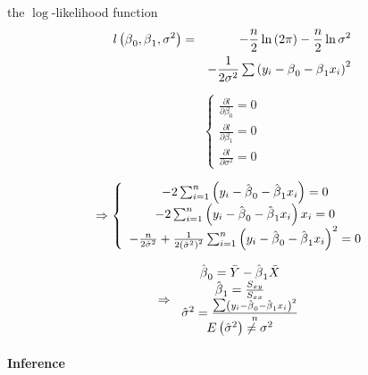 \documentclass{article}
\begin{document}
the $\log $-likelihood function%
\begin{eqnarray*}
l\left( \beta _{0},\beta _{1},\sigma ^{2}\right) &=&-\frac{n}{2}\ln \left(
2\pi \right) -\frac{n}{2}\ln \sigma ^{2} \\
&&-\frac{1}{2\sigma ^{2}}\tsum \left( y_{i}-\beta _{0}-\beta
_{1}x_{i}\right) ^{2}
\end{eqnarray*}

\begin{equation*}
\left\{ 
\begin{array}{c}
\frac{\partial l}{\partial \beta _{0}}=0 \\ 
\frac{\partial l}{\partial \beta _{1}}=0 \\ 
\frac{\partial l}{\partial \sigma ^{2}}=0%
\end{array}%
\right.
\end{equation*}

\begin{equation*}
\Rightarrow \left\{ 
\begin{array}{c}
-2\tsum_{i=1}^{n}\left( y_{i}-\hat{\beta}_{0}-\hat{\beta}_{1}x_{i}\right) =0
\\ 
-2\tsum_{i=1}^{n}\left( y_{i}-\hat{\beta}_{0}-\hat{\beta}_{1}x_{i}\right)
x_{i}=0 \\ 
-\frac{n}{2\hat{\sigma}^{2}}+\frac{1}{2\left( \hat{\sigma}^{2}\right) ^{2}}%
\tsum_{i=1}^{n}\left( y_{i}-\hat{\beta}_{0}-\hat{\beta}_{1}x_{i}\right)
^{2}=0%
\end{array}%
\right.
\end{equation*}

\begin{equation*}
\Rightarrow \left. 
\begin{array}{c}
\hat{\beta}_{0}=\bar{Y}-\hat{\beta}_{1}\bar{X} \\ 
\hat{\beta}_{1}=\frac{S_{xy}}{S_{xx}} \\ 
\hat{\sigma}^{2}=\frac{\tsum \left( y_{i}-\hat{\beta}_{0}-\hat{\beta}%
_{1}x_{i}\right) ^{2}}{n} \\ 
E\left( \hat{\sigma}^{2}\right) \neq \sigma ^{2}%
\end{array}%
\right.
\end{equation*}

\bigskip

\paragraph{Inference}
\end{document}
